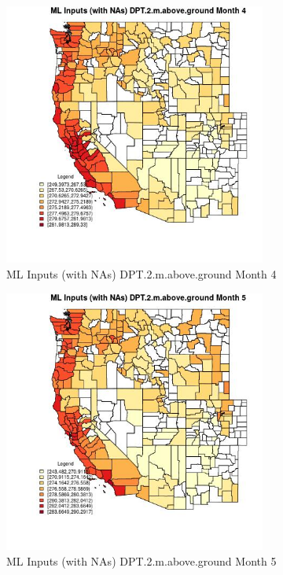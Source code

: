 \begin{figure} 
\centering  
\includegraphics[width=0.77\textwidth]{Code_Outputs/Report_ML_input_PM25_Step4_part_f_de_duplicated_aves_prioritize_24hr_obswNAs_CountyDPT2mabovegroundmedianMonth4.jpg} 
\caption{\label{fig:Report_ML_input_PM25_Step4_part_f_de_duplicated_aves_prioritize_24hr_obswNAsCountyDPT2mabovegroundmedianMonth4}ML Inputs (with NAs) DPT.2.m.above.ground Month 4} 
\end{figure} 
 

\begin{figure} 
\centering  
\includegraphics[width=0.77\textwidth]{Code_Outputs/Report_ML_input_PM25_Step4_part_f_de_duplicated_aves_prioritize_24hr_obswNAs_CountyDPT2mabovegroundmedianMonth5.jpg} 
\caption{\label{fig:Report_ML_input_PM25_Step4_part_f_de_duplicated_aves_prioritize_24hr_obswNAsCountyDPT2mabovegroundmedianMonth5}ML Inputs (with NAs) DPT.2.m.above.ground Month 5} 
\end{figure} 
 

